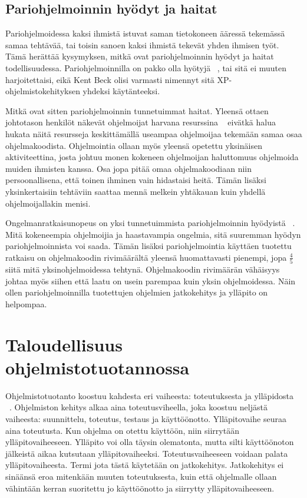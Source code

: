 \documentclass[finnish]{tktltiki2}
\theoremstyle{definition}
\theoremstyle{remark}
\begin{document}
\subsection{Pariohjelmoinnin hyödyt ja haitat}

Pariohjelmoidessa kaksi ihmistä istuvat saman tietokoneen ääressä tekemässä samaa tehtävää, tai toisin sanoen kaksi ihmistä tekevät yhden ihmisen työt. Tämä herättää kysymyksen, mitkä ovat pariohjelmoinnin hyödyt ja haitat todellisuudessa. Pariohjelmoinnilla on pakko olla hyötyjä  ~\cite{costandbenefit}, tai sitä ei muuten harjoitettaisi, eikä Kent Beck olisi varmasti nimennyt sitä XP-ohjelmistokehityksen yhdeksi käytänteeksi.

Mitkä ovat sitten pariohjelmoinnin tunnetuimmat haitat. Yleensä ottaen johtotason henkilöt näkevät ohjelmoijat harvana resurssina ~\cite{costandbenefit2} eivätkä halua hukata näitä resursseja keskittämällä useampaa ohjelmoijaa tekemään samaa osaa ohjelmakoodista. Ohjelmointia ollaan myös yleensä opetettu yksinäisen aktiviteettina, josta johtuu monen kokeneen ohjelmoijan haluttomuus ohjelmoida muiden ihmisten kanssa. Osa jopa pitää omaa ohjelmakoodiaan niin persoonallisena, että toinen ihminen vain hidastaisi heitä. Tämän lisäksi yksinkertaisiin tehtäviin saattaa mennä melkein yhtäkauan kuin yhdellä ohjelmoijallakin menisi.

Ongelmanratkaisunopeus on yksi tunnetuimmista pariohjelmoinnin hyödyistä ~\cite{costandbenefit2}. Mitä kokeneempia ohjelmoijia ja haastavampia ongelmia, sitä suuremman hyödyn pariohjelmoinnista voi saada. Tämän lisäksi pariohjelmointia käyttäen tuotettu ratkaisu on ohjelmakoodin rivimäärältä yleensä huomattavasti pienempi, jopa $\frac{4}{5}$ siitä mitä yksinohjelmoidessa tehtynä. Ohjelmakoodin rivimäärän vähäisyys johtaa myös siihen että laatu on usein parempaa kuin yksin ohjelmoidessa. Näin ollen pariohjelmoinnilla tuotettujen ohjelmien jatkokehitys ja ylläpito on helpompaa.


\section{Taloudellisuus ohjelmistotuotannossa}

Ohjelmistotuotanto koostuu kahdesta eri vaiheesta: toteutuksesta ja ylläpidosta ~\cite{sommerville1998requirements}. Ohjelmiston kehitys alkaa aina toteutusviheella, joka koostuu neljästä vaiheesta: suunnittelu, toteutus, testaus ja käyttöönotto. Ylläpitovaihe seuraa aina toteutusta. Kun ohjelma on otettu käyttöön, niin siirrytään ylläpitovaiheeseen. Ylläpito voi olla täysin olematonta, mutta silti käyttöönoton jälkeistä aikaa kutsutaan ylläpitovaiheeksi. Toteutusvaiheeseen voidaan palata ylläpitovaiheesta. Termi jota tästä käytetään on jatkokehitys. Jatkokehitys ei sinäänsä eroa mitenkään muuten toteutuksesta, kuin että ohjelmalle ollaan vähintään kerran suoritettu jo käyttöönotto ja siirrytty ylläpitovaiheeseen.
\end{document}
